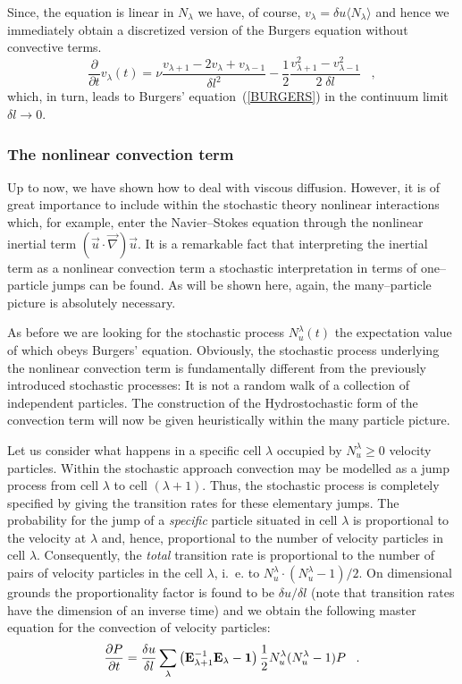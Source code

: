 Since, the equation is linear in $N_{\lambda}$ we have, of course,
$v_{\lambda} = \delta u \langle N_{\lambda} \rangle$ and hence
we immediately obtain a discretized version of the Burgers equation without
convective terms. 
\begin{equation}
\label{DISCRETEBURGERS}
\frac{\partial}{\partial t} v_{\lambda}(t) =
\nu \frac{v_{\lambda +1} -2 v_{\lambda} +
v_{\lambda -1}}{\delta l^2}
- \frac{1}{2} \frac{v_{\lambda+1}^2 -
v_{\lambda -1}^2}{2 \; \delta l }
\;\;\; ,
\end{equation}
which, in turn, leads to Burgers' equation~(\ref{BURGERS}) in the
continuum limit $\delta l \longrightarrow 0$.

\subsubsection{The nonlinear convection term}
Up to now, we have shown how to deal with  viscous diffusion. 
However, it is of great importance
to include
within the stochastic theory nonlinear interactions which, for
example, enter
the Navier--Stokes equation through the nonlinear inertial term
$(\vec{u} \cdot \vec{\nabla}) \vec{u}$. It is a remarkable fact
that interpreting
the inertial term as a nonlinear convection term a
stochastic interpretation
in terms of one--particle jumps can be found. As will be shown
here, again,
the many--particle picture is absolutely necessary.

As before we are looking for the stochastic process
$N_u^{\lambda}(t)$
the expectation value of which obeys Burgers' equation. Obviously,
the
stochastic process underlying the
nonlinear convection term is fundamentally different from the
previously
introduced stochastic processes: It is not a random walk of
a collection
of independent particles.
The construction of the Hydrostochastic form of the
convection term will now be given heuristically
within the many particle picture.
 

Let us consider what happens in a specific cell $\lambda$ occupied
by
$N_u^{\lambda} \geq 0$ velocity particles. Within the stochastic
approach
convection may be modelled as a jump process from cell
$\lambda$ to cell $(\lambda + 1)$.
Thus, the stochastic process is
completely specified by giving the transition rates for
these elementary jumps. The probability for the jump of a
{\em{specific}} particle situated in cell $\lambda$ is proportional
to the velocity at $\lambda$ and, hence, proportional to the
number of velocity particles in cell $\lambda$.
Consequently, the
{\em total} transition rate is proportional to the number of pairs
of velocity particles in the cell $\lambda$, i.~e. to
$N_u^{\lambda} \cdot
(N_u^{\lambda} - 1) / 2$. On dimensional grounds the
proportionality factor
is found to be $\delta u / \delta l$ (note that transition rates
have
the dimension of an inverse time) and we obtain the following master
equation for the convection of velocity particles:
\begin{equation}
\frac{\partial P}{\partial t}  = 
\frac{\delta u}{\delta l} \sum_{\lambda}
     \left( {\bf E}_{\lambda +1}^{-1} {\bf E}_{\lambda} - {\bf 1}
    \right) \frac{1}{2} N_u^{\lambda} (N_u^{\lambda}-1) P
\;\;\; .
\end{equation}
 

